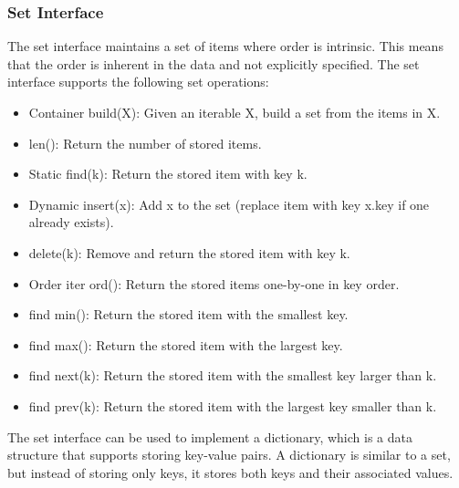 \documentclass[a4paper, 11pt, oneside]{book} %
\begin{document}
\subsubsection{Set Interface}
The set interface maintains a set of items where order is intrinsic. This means that the order is inherent in the data and not explicitly specified. The set interface supports the following set operations:


\begin{itemize}
    \item Container build(X): Given an iterable X, build a set from the items in X.
    \item len(): Return the number of stored items.
    \item Static find(k): Return the stored item with key k.
    \item Dynamic insert(x): Add x to the set (replace item with key x.key if one already exists).
    \item delete(k): Remove and return the stored item with key k.
    \item Order iter ord(): Return the stored items one-by-one in key order.
    \item find min(): Return the stored item with the smallest key.
    \item find max(): Return the stored item with the largest key.
    \item find next(k): Return the stored item with the smallest key larger than k.
    \item find prev(k): Return the stored item with the largest key smaller than k.
\end{itemize}


The set interface can be used to implement a dictionary, which is a data structure that supports storing key-value pairs. A dictionary is similar to a set, but instead of storing only keys, it stores both keys and their associated values.
\end{document}
